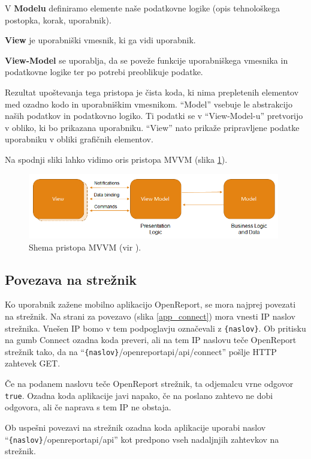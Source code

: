 \documentclass[a4paper, 12pt]{book}
\begin{document}
V \textbf{Modelu} definiramo elemente naše podatkovne logike (opis tehnološkega postopka, korak, uporabnik).

\textbf{View} je uporabniški vmesnik, ki ga vidi uporabnik.

\textbf{View-Model} se uporablja, da se poveže funkcije uporabniškega vmesnika in podatkovne logike ter po potrebi preoblikuje podatke.

Rezultat upoštevanja tega pristopa je čista koda, ki nima prepletenih elementov med ozadno kodo in uporabniškim vmesnikom.
\enquote{Model} vsebuje le abstrakcijo naših podatkov in podatkovno logiko.
Ti podatki se v \enquote{View-Model-u} pretvorijo v obliko, ki bo prikazana uporabniku.
\enquote{View} nato prikaže pripravljene podatke uporabniku v obliki grafičnih elementov.

Na spodnji sliki lahko vidimo oris pristopa MVVM (slika \ref{mvvm}).

\begin{figure}[H]
\begin{center}
\includegraphics[width=11cm]{mvvm}
\end{center}
	\caption{Shema pristopa MVVM (vir \cite{mvvmimage}).}
\label{mvvm}
\end{figure}

\subsection{Povezava na strežnik}

Ko uporabnik zažene mobilno aplikacijo OpenReport, se mora najprej povezati na strežnik.
Na strani za povezavo (slika \ref{app_connect}) mora vnesti IP naslov strežnika.
Vnešen IP bomo v tem podpoglavju označevali z \texttt{\{naslov\}}.
Ob pritisku na gumb Connect ozadna koda preveri, ali na tem IP naslovu teče OpenReport strežnik tako, da na \enquote{\texttt{\{naslov\}}/openreportapi/api/connect} pošlje HTTP zahtevek GET.

Če na podanem naslovu teče OpenReport strežnik, ta odjemalcu vrne odgovor \texttt{true}.
Ozadna koda aplikacije javi napako, če na poslano zahtevo ne dobi odgovora, ali če naprava s tem IP ne obstaja.

Ob uspešni povezavi na strežnik ozadna koda aplikacije uporabi naslov \enquote{\texttt{\{naslov\}}/openreportapi/api} kot predpono vseh nadaljnjih zahtevkov na strežnik.
\end{document}
